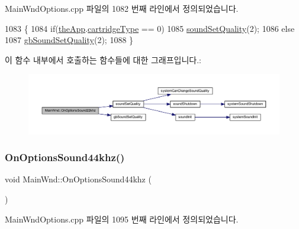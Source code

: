 Main\+Wnd\+Options.\+cpp 파일의 1082 번째 라인에서 정의되었습니다.


\begin{DoxyCode}
1083 \{
1084   \textcolor{keywordflow}{if}(\mbox{\hyperlink{_v_b_a_8cpp_a8095a9d06b37a7efe3723f3218ad8fb3}{theApp}}.\mbox{\hyperlink{class_v_b_a_af300759fcbc7eeb00ce73f956fc5ddb7}{cartridgeType}} == 0)
1085     \mbox{\hyperlink{_sound_8cpp_a46bef5048521e8000f3850e686e7eb22}{soundSetQuality}}(2);
1086   \textcolor{keywordflow}{else}
1087     \mbox{\hyperlink{_g_b_8h_a86ed9a5e6bb5230a501d753280690618}{gbSoundSetQuality}}(2);
1088 \}
\end{DoxyCode}
이 함수 내부에서 호출하는 함수들에 대한 그래프입니다.\+:
\nopagebreak
\begin{figure}[H]
\begin{center}
\leavevmode
\includegraphics[width=350pt]{class_main_wnd_af0c7e1b51b3b500531bbef87b56b5fe7_cgraph}
\end{center}
\end{figure}
\mbox{\label{class_main_wnd_a3045a6a1996566e65701d44a0db19a50}} 
\subsubsection{\texorpdfstring{On\+Options\+Sound44khz()}{OnOptionsSound44khz()}}
{\footnotesize\ttfamily void Main\+Wnd\+::\+On\+Options\+Sound44khz (\begin{DoxyParamCaption}{ }\end{DoxyParamCaption})\hspace{0.3cm}{\ttfamily [protected]}}



Main\+Wnd\+Options.\+cpp 파일의 1095 번째 라인에서 정의되었습니다.


